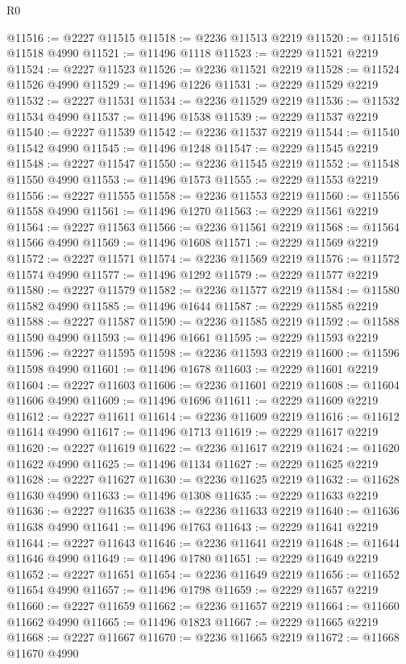 \begin{lexlean}{R0}
\begin{coremodule}
@11516 := @2227 @11515
@11518 := @2236 @11513 @2219
@11520 := @11516 @11518 @4990
@11521 := @11496 @1118
@11523 := @2229 @11521 @2219
@11524 := @2227 @11523
@11526 := @2236 @11521 @2219
@11528 := @11524 @11526 @4990
@11529 := @11496 @1226
@11531 := @2229 @11529 @2219
@11532 := @2227 @11531
@11534 := @2236 @11529 @2219
@11536 := @11532 @11534 @4990
@11537 := @11496 @1538
@11539 := @2229 @11537 @2219
@11540 := @2227 @11539
@11542 := @2236 @11537 @2219
@11544 := @11540 @11542 @4990
@11545 := @11496 @1248
@11547 := @2229 @11545 @2219
@11548 := @2227 @11547
@11550 := @2236 @11545 @2219
@11552 := @11548 @11550 @4990
@11553 := @11496 @1573
@11555 := @2229 @11553 @2219
@11556 := @2227 @11555
@11558 := @2236 @11553 @2219
@11560 := @11556 @11558 @4990
@11561 := @11496 @1270
@11563 := @2229 @11561 @2219
@11564 := @2227 @11563
@11566 := @2236 @11561 @2219
@11568 := @11564 @11566 @4990
@11569 := @11496 @1608
@11571 := @2229 @11569 @2219
@11572 := @2227 @11571
@11574 := @2236 @11569 @2219
@11576 := @11572 @11574 @4990
@11577 := @11496 @1292
@11579 := @2229 @11577 @2219
@11580 := @2227 @11579
@11582 := @2236 @11577 @2219
@11584 := @11580 @11582 @4990
@11585 := @11496 @1644
@11587 := @2229 @11585 @2219
@11588 := @2227 @11587
@11590 := @2236 @11585 @2219
@11592 := @11588 @11590 @4990
@11593 := @11496 @1661
@11595 := @2229 @11593 @2219
@11596 := @2227 @11595
@11598 := @2236 @11593 @2219
@11600 := @11596 @11598 @4990
@11601 := @11496 @1678
@11603 := @2229 @11601 @2219
@11604 := @2227 @11603
@11606 := @2236 @11601 @2219
@11608 := @11604 @11606 @4990
@11609 := @11496 @1696
@11611 := @2229 @11609 @2219
@11612 := @2227 @11611
@11614 := @2236 @11609 @2219
@11616 := @11612 @11614 @4990
@11617 := @11496 @1713
@11619 := @2229 @11617 @2219
@11620 := @2227 @11619
@11622 := @2236 @11617 @2219
@11624 := @11620 @11622 @4990
@11625 := @11496 @1134
@11627 := @2229 @11625 @2219
@11628 := @2227 @11627
@11630 := @2236 @11625 @2219
@11632 := @11628 @11630 @4990
@11633 := @11496 @1308
@11635 := @2229 @11633 @2219
@11636 := @2227 @11635
@11638 := @2236 @11633 @2219
@11640 := @11636 @11638 @4990
@11641 := @11496 @1763
@11643 := @2229 @11641 @2219
@11644 := @2227 @11643
@11646 := @2236 @11641 @2219
@11648 := @11644 @11646 @4990
@11649 := @11496 @1780
@11651 := @2229 @11649 @2219
@11652 := @2227 @11651
@11654 := @2236 @11649 @2219
@11656 := @11652 @11654 @4990
@11657 := @11496 @1798
@11659 := @2229 @11657 @2219
@11660 := @2227 @11659
@11662 := @2236 @11657 @2219
@11664 := @11660 @11662 @4990
@11665 := @11496 @1823
@11667 := @2229 @11665 @2219
@11668 := @2227 @11667
@11670 := @2236 @11665 @2219
@11672 := @11668 @11670 @4990

\end{coremodule}
\end{lexlean}
